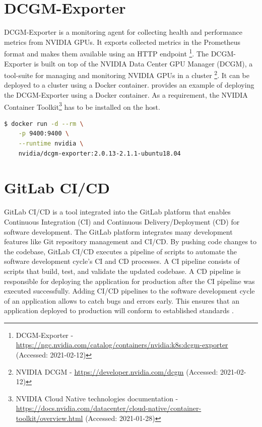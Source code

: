 \section{DCGM-Exporter}
DCGM-Exporter is a monitoring agent for collecting health and performance metrics from NVIDIA GPUs. It exports collected metrics in the Prometheus format and makes them available using an HTTP endpoint \footnote{DCGM-Exporter - \url{https://ngc.nvidia.com/catalog/containers/nvidia:k8s:dcgm-exporter} (Accessed: 2021-02-12)}.
The DCGM-Exporter is built on top of the NVIDIA Data Center GPU Manager (DCGM), a tool-suite for managing and monitoring NVIDIA GPUs in a cluster \footnote{NVIDIA DCGM - \url{https://developer.nvidia.com/dcgm} (Accessed: 2021-02-12)}.
%
It can be deployed to a cluster using a Docker container.  provides an example of deploying the DCGM-Exporter using a Docker container. As a requirement, the NVIDIA Container Toolkit\footnote{NVIDIA Cloud Native technologies documentation - \url{https://docs.nvidia.com/datacenter/cloud-native/container-toolkit/overview.html} (Accessed: 2021-01-28)} has to be installed on the host.
\begin{lstlisting}[label=lst:04_dcgm_deploy, caption=DCGM-Exporter deployment using a Docker container, language=bash, numbers=none]
$ docker run -d --rm \
    -p 9400:9400 \
    --runtime nvidia \
    nvidia/dcgm-exporter:2.0.13-2.1.1-ubuntu18.04
\end{lstlisting}


\section{GitLab CI/CD}
\label{sec:04_background_gitlab}
GitLab CI/CD is a tool integrated into the GitLab platform that enables Continuous Integration (CI) and Continuous Delivery/Deployment (CD) for software development.
The GitLab platform integrates many development features like Git repository management and CI/CD.
By pushing code changes to the codebase, GitLab CI/CD executes a pipeline of scripts to automate the software development cycle's CI and CD processes.
A CI pipeline consists of scripts that build, test, and validate the updated codebase.
A CD pipeline is responsible for deploying the application for production after the CI pipeline was executed successfully.
Adding CI/CD pipelines to the software development cycle of an application allows to catch bugs and errors early. This ensures that an application deployed to production will conform to established standards \cite{Gitlab2020Docs}.

